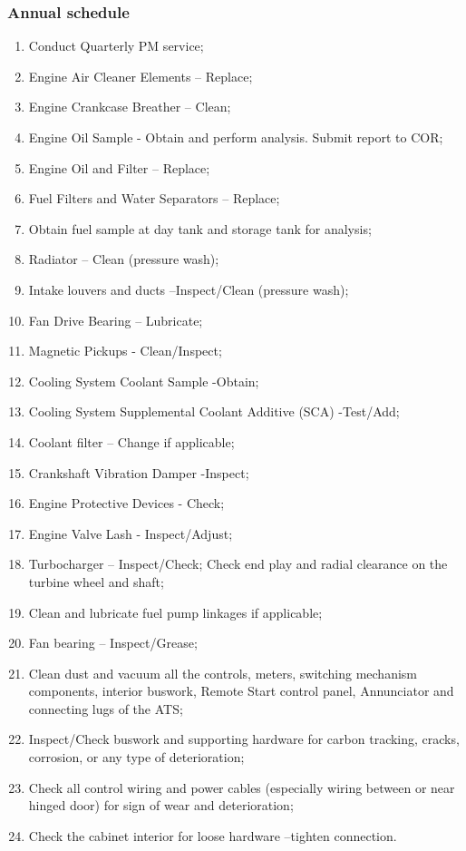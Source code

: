 \subsubsection{Annual schedule}
\begin{enumerate}[label=(\alph*)]
\item Conduct Quarterly PM service;
\item Engine Air Cleaner Elements – Replace;
\item Engine Crankcase Breather – Clean; 
\item Engine Oil Sample - Obtain and perform analysis.  Submit report to COR;
\item Engine Oil and Filter – Replace;
\item Fuel Filters and Water Separators – Replace;
\item Obtain fuel sample at day tank and storage tank for analysis;
\item Radiator – Clean (pressure wash);
\item Intake louvers and ducts –Inspect/Clean (pressure wash);
\item Fan Drive Bearing – Lubricate;
\item Magnetic Pickups - Clean/Inspect;
\item Cooling System Coolant Sample  -Obtain;
\item Cooling System Supplemental Coolant Additive (SCA) -Test/Add;
\item Coolant filter – Change if applicable;
\item Crankshaft Vibration Damper -Inspect;
\item Engine Protective Devices - Check;
\item Engine Valve Lash - Inspect/Adjust;
\item Turbocharger – Inspect/Check; Check end play and radial clearance on the turbine wheel and shaft; 
\item Clean and lubricate fuel pump linkages if applicable;
\item Fan bearing – Inspect/Grease;
\item Clean dust and vacuum all the controls, meters, switching mechanism components, interior buswork, Remote Start control panel, Annunciator and connecting lugs of the ATS;
\item Inspect/Check buswork and supporting hardware for carbon tracking, cracks, corrosion, or any type of deterioration;
\item Check all control wiring and power cables (especially wiring between or near hinged door) for sign of wear and deterioration;
\item Check the cabinet interior for loose hardware –tighten connection.
\end{enumerate}

